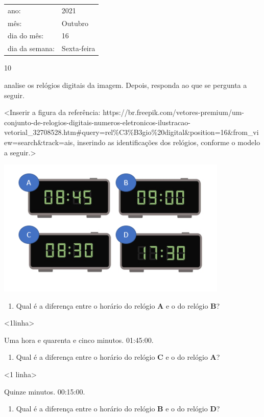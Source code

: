 \begin{longtable}[]{@{}ll@{}}
\toprule
ano: & 2021\tabularnewline
mês: & Outubro\tabularnewline
dia do mês: & 16\tabularnewline
dia da semana: & Sexta-feira\tabularnewline
\bottomrule
\end{longtable}


\num{10}

analise os relógios digitais da imagem. Depois, responda ao que se pergunta a seguir.

\textless{}Inserir a figura da referência:
https://br.freepik.com/vetores-premium/um-conjunto-de-relogios-digitais-numeros-eletronicos-ilustracao-vetorial\_32708528.htm\#query=rel\%C3\%B3gio\%20digital\&position=16\&from\_view=search\&track=ais,
inserindo as identificações dos relógios, conforme o modelo a
seguir.\textgreater{}

\includegraphics[width=4.34174in,height=2.58209in]{media/image38.png}

\begin{enumerate}
\def\labelenumi{\Alph{enumi})}
\item
  Qual é a diferença entre o horário do relógio \textbf{A} e o do relógio \textbf{B}?
\end{enumerate}

\textless{}1linha\textgreater{}

Uma hora e quarenta e cinco minutos. 01:45:00.

\begin{enumerate}
\def\labelenumi{\Alph{enumi})}
\item
  Qual é a diferença entre o horário do relógio \textbf{C} e o do relógio \textbf{A}?
\end{enumerate}

\textless{}1 linha\textgreater{}

Quinze minutos. 00:15:00.

\begin{enumerate}
\def\labelenumi{\Alph{enumi})}
\item
  Qual é a diferença entre o horário do relógio \textbf{B} e o do relógio \textbf{D}?
\end{enumerate}


